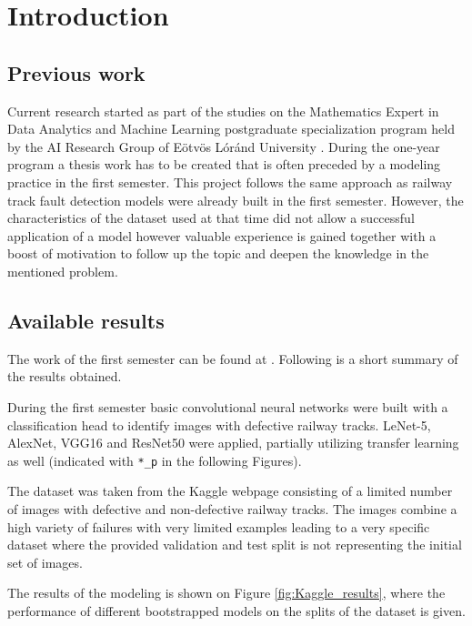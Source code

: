 \section{Introduction}
\subsection{Previous work}
Current research started as part of the studies on the Mathematics Expert in
Data Analytics and Machine Learning postgraduate specialization program \cite{_ai&ml_}
held by the AI Research Group of Eötvös Lóránd University \cite{_ai_}.
During the one-year program a thesis work has to be created that is often
preceded by a modeling practice in the first semester.
This project follows the same approach as railway track fault detection models
were already built in the first semester.
However, the characteristics of the dataset used at that time did not allow a
successful application of a model however valuable experience is gained together
with a boost of motivation to follow up the topic and deepen the knowledge in the
mentioned problem.

\subsection{Available results}
The work of the first semester can be found at \cite{tomcom_mathemathical_2022}.
Following is a short summary of the results obtained.

During the first semester basic convolutional neural networks were built with a classification
head to identify images with defective railway tracks.
LeNet-5, AlexNet, VGG16 and ResNet50 were applied, partially utilizing transfer learning as well
(indicated with \lstinline{*_p} in the following Figures).

The dataset was taken from the Kaggle webpage \cite{_railway_} consisting of a limited
number of images with defective and non-defective railway tracks.
The images combine a high variety of failures with very limited examples leading to a very
specific dataset where the provided validation and test split is not representing the initial
set of images.

The results of the modeling is shown on Figure \ref{fig:Kaggle_results}, where the performance of
different bootstrapped models on the splits of the dataset is given.

